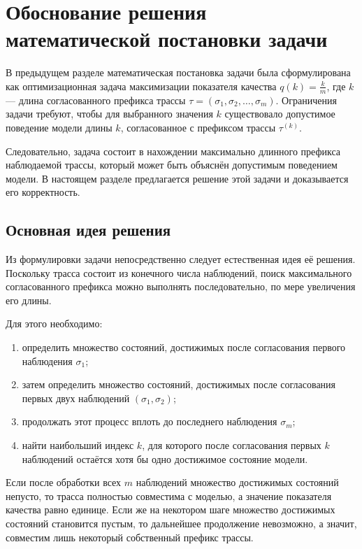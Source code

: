 \section{Обоснование решения математической постановки задачи}

В предыдущем разделе математическая постановка задачи была сформулирована как
оптимизационная задача максимизации показателя качества $q(k)=\frac{k}{m}$, где
$k$ --- длина согласованного префикса трассы
$\tau=(\sigma_1,\sigma_2,\dots,\sigma_m)$. Ограничения задачи требуют, чтобы
для выбранного значения $k$ существовало допустимое поведение модели длины $k$,
согласованное с префиксом трассы $\tau^{(k)}$.

Следовательно, задача состоит в нахождении максимально длинного префикса
наблюдаемой трассы, который может быть объяснён допустимым поведением модели. В
настоящем разделе предлагается решение этой задачи и доказывается его
корректность.

\subsection{Основная идея решения}

Из формулировки задачи непосредственно следует естественная идея её решения.
Поскольку трасса состоит из конечного числа наблюдений, поиск максимального
согласованного префикса можно выполнять последовательно, по мере увеличения его
длины.

Для этого необходимо:
\begin{enumerate}[leftmargin=0pt,itemindent=4.6em]
    \item определить множество состояний, достижимых после согласования первого
    наблюдения $\sigma_1$;
    \item затем определить множество состояний, достижимых после согласования
    первых двух наблюдений $(\sigma_1,\sigma_2)$;
    \item продолжать этот процесс вплоть до последнего наблюдения $\sigma_m$;
    \item найти наибольший индекс $k$, для которого после согласования первых
    $k$ наблюдений остаётся хотя бы одно достижимое состояние модели.
\end{enumerate}

Если после обработки всех $m$ наблюдений множество достижимых состояний
непусто, то трасса полностью совместима с моделью, а значение показателя
качества равно единице. Если же на некотором шаге множество достижимых
состояний становится пустым, то дальнейшее продолжение невозможно, а значит,
совместим лишь некоторый собственный префикс трассы.


